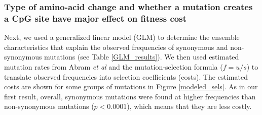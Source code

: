 \documentclass{article}
\begin{document}

\subsubsection*{Type of amino-acid change and whether a mutation creates a CpG site have major effect on fitness cost}
Next, we used a generalized linear model (GLM) to determine the ensemble  characteristics that explain the observed frequencies of synonymous and non-synonymous mutations (see Table \ref{GLM_results}).
We then used estimated mutation rates from Abram \textit {et al} \cite{abram2010nature}
and the mutation-selection formula ($f = u / s$) to translate observed frequencies into selection coefficients (costs). 
The estimated costs are shown for some groups of mutations in Figure \ref{modeled_sels}.
As in our first result, overall, synonymous mutations were found at higher frequencies than non-synonymous mutations ($p < 0.0001$), which means that they are less costly.
\end{document}
